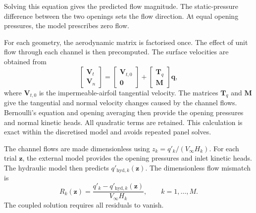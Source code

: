 \documentclass[a4paper,fleqn]{cas-dc}
\begin{document}
Solving this equation gives the predicted flow magnitude.
The static-pressure difference between the two openings sets the flow direction.
At equal opening pressures, the model prescribes zero flow.

For each geometry, the aerodynamic matrix is factorised once. 
The effect of unit flow through each channel is then precomputed.
The surface velocities are obtained from
\begin{equation}
	\begin{bmatrix}
		\mathbf{V}_t\\
		\mathbf{V}_n
	\end{bmatrix}
	=
	\begin{bmatrix}
		\mathbf{V}_{t,0}\\
		\mathbf{0}
	\end{bmatrix}
	+
	\begin{bmatrix}
		\mathbf{T}_q\\
		\mathbf{M}
	\end{bmatrix}
	\mathbf{q},
	\label{eq:reduced_velocity_system}
\end{equation}
where $\mathbf{V}_{t,0}$ is the impermeable-airfoil
tangential velocity.
The matrices $\mathbf{T}_q$ and $\mathbf{M}$ give
the tangential and normal velocity changes caused
by the channel flows.
Bernoulli's equation and opening averaging then provide
the opening pressures and normal kinetic heads.
All quadratic terms are retained.
This calculation is exact within the discretised model
and avoids repeated panel solves.

The channel flows are made dimensionless using
$z_k=q'_k/(V_{\infty}H_k)$.
For each trial $\mathbf{z}$, the external model provides
the opening pressures and inlet kinetic heads.
The hydraulic model then predicts
$q'_{\mathrm{hyd},k}(\mathbf{z})$.
The dimensionless flow mismatch is
\begin{equation}
	R_k(\mathbf{z})
	=
	\frac{q'_k-q'_{\mathrm{hyd},k}(\mathbf{z})}
	{V_{\infty}H_k},
	\qquad k=1,\ldots,M.
	\label{eq:coupled_residual}
\end{equation}
The coupled solution requires all residuals to vanish.
\end{document}
